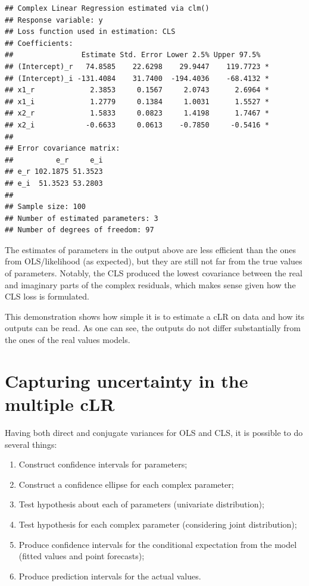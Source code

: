 \documentclass[
]{book}
\providecommand{\tightlist}{%
  \setlength{\itemsep}{0pt}\setlength{\parskip}{0pt}}
\begin{document}
\begin{verbatim}
## Complex Linear Regression estimated via clm()
## Response variable: y
## Loss function used in estimation: CLS
## Coefficients:
##                Estimate Std. Error Lower 2.5% Upper 97.5%  
## (Intercept)_r   74.8585    22.6298    29.9447    119.7723 *
## (Intercept)_i -131.4084    31.7400  -194.4036    -68.4132 *
## x1_r             2.3853     0.1567     2.0743      2.6964 *
## x1_i             1.2779     0.1384     1.0031      1.5527 *
## x2_r             1.5833     0.0823     1.4198      1.7467 *
## x2_i            -0.6633     0.0613    -0.7850     -0.5416 *
## 
## Error covariance matrix:
##          e_r     e_i
## e_r 102.1875 51.3523
## e_i  51.3523 53.2803
## 
## Sample size: 100
## Number of estimated parameters: 3
## Number of degrees of freedom: 97
\end{verbatim}

The estimates of parameters in the output above are less efficient than the ones from OLS/likelihood (as expected), but they are still not far from the true values of parameters. Notably, the CLS produced the lowest covariance between the real and imaginary parts of the complex residuals, which makes sense given how the CLS loss is formulated.

This demonstration shows how simple it is to estimate a cLR on data and how its outputs can be read. As one can see, the outputs do not differ substantially from the ones of the real values models.

\hypertarget{capturing-uncertainty-in-the-multiple-clr}{%
\section{Capturing uncertainty in the multiple cLR}\label{capturing-uncertainty-in-the-multiple-clr}}

Having both direct and conjugate variances for OLS and CLS, it is possible to do several things:

\begin{enumerate}
\def\labelenumi{\arabic{enumi}.}
\tightlist
\item
  Construct confidence intervals for parameters;
\item
  Construct a confidence ellipse for each complex parameter;
\item
  Test hypothesis about each of parameters (univariate distribution);
\item
  Test hypothesis for each complex parameter (considering joint distribution);
\item
  Produce confidence intervals for the conditional expectation from the model (fitted values and point forecasts);
\item
  Produce prediction intervals for the actual values.
\end{enumerate}
\end{document}
